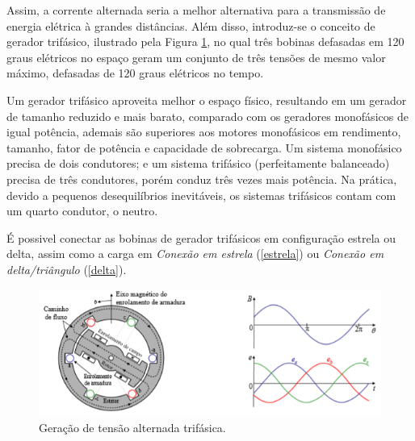 \documentclass[a4paper,12pt,oneside,openany,table,xcdraw]{article}
\begin{document}
Assim, a corrente alternada seria a melhor alternativa para a transmissão de energia elétrica à grandes distâncias. Além disso, introduz-se o conceito de gerador trifásico, ilustrado pela Figura \ref{gerador}, no qual três bobinas defasadas em 120 graus elétricos no espaço geram um conjunto de três tensões de mesmo valor máximo, defasadas de 120 graus elétricos no tempo.

Um gerador trifásico aproveita melhor o espaço físico, resultando em um gerador de tamanho reduzido e mais barato, comparado com os geradores monofásicos de igual potência, ademais são superiores aos motores monofásicos em rendimento, tamanho, fator de potência e capacidade de sobrecarga.
Um sistema monofásico precisa de dois condutores; e um sistema trifásico (perfeitamente balanceado) precisa de três condutores, porém conduz três vezes mais potência. Na prática, devido a pequenos desequilíbrios inevitáveis, os sistemas trifásicos contam com um quarto condutor, o neutro.

É possivel conectar as bobinas de gerador trifásicos em configuração estrela ou delta, assim como a carga em \emph{Conexão em estrela} (\ref{estrela}) ou  \emph{Conexão em delta/triângulo} (\ref{delta}).
\begin{figure}[H]
\centering
\captionsetup{font=scriptsize}
\includegraphics[width=14.5cm]{motor3phi}
\caption{Geração de tensão alternada trifásica.}
\label{gerador}
\end{figure}
\end{document}
